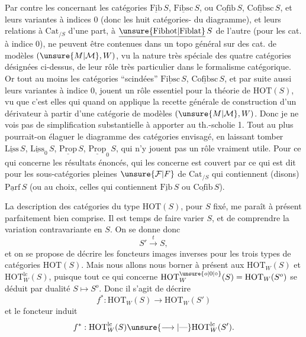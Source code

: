 Par contre les  concernant les catégories $\underline{\mathrm{Fib}}\,S$, $\underline{\mathrm{Fibsc}}\,S$, ou $\underline{\mathrm{Cofib}}\,S$, $\underline{\mathrm{Cofibsc}}\,S$, et leurs variantes à indices $0$ (donc les huit catégories- du diagramme), et leurs relations à $\mathrm{Cat}_{/S}$ d'une part, à $\underline{\unsure{\mathrm{Fibhot}|\mathrm{Fiblat}}}\,S$ de l'autre (pour les cat. à indice $0$), ne peuvent être contenues dans un topo général sur des  cat. de modèles $(\unsure{M|\mathcal M},W)$,  vu la nature très spéciale des quatre catégories désignées ci-dessus, de leur rôle très particulier dans le  formalisme catégorique. Or tout au moins les catégories ``scindées'' $\underline{\mathrm{Fibsc}}\,S$, $\underline{\mathrm{Cofibsc}}\,S$, et par suite aussi leurs variantes à indice $0$, jouent un rôle essentiel pour la théorie de $\mathrm{HOT}(S)$, vu que c'est elles qui
 quand on applique la recette générale de construction d'un dérivateur à partir d'une catégorie de modèles $(\unsure{M|\mathcal M},W)$. Donc je ne vois pas de simplification substantielle à apporter au th.-scholie 1. Tout au plus pourrait-on élaguer le diagramme des catégories envisagé, en laissant tomber $\underline{\mathrm{Liss}}\,S$, $\underline{\mathrm{Liss}}_0\,S$, $\underline{\mathrm{Prop}}\,S$, $\underline{\mathrm{Prop}}_0\,S$, qui n'y jouent pas un rôle vraiment utile.
Pour ce qui concerne les résultats énoncés,  qui les concerne est couvert par ce qui est dit pour les sous-catégories pleines $\unsure{\mathcal F|F}$ de $\mathrm{Cat}_{/S}$ qui contiennent (disons) $\underline{\mathrm{Parf}}\,S$ (ou au choix, celles qui contiennent $\underline{\mathrm{Fib}}\,S$ ou $\underline{\mathrm{Cofib}}\,S$).


La description des catégories du type $\mathrm{HOT}(S)$, pour $S$ fixé, me paraît à présent parfaitement bien comprise. Il est temps de faire varier $S$, et de comprendre la variation contravariante en $S$. On se donne donc
\[
S'\xrightarrow{t}S,
\]
et on se propose de décrire les foncteurs images inverses pour les trois types de catégories $\mathrm{HOT}(S)$. Mais nous allons nous borner à présent aux $\mathrm{HOT}_W(S)$ et $\mathrm{HOT}^{\mathrm{lc}}_W(S)$, puisque tout ce qui concerne $\mathrm{HOT}^{\unsure{o|0|\circ}}_W(S)=\mathrm{HOT}_W(S^o)$  se déduit par dualité $S\longmapsto S^o$. Donc il s'agit de décrire
\[
f^*:\mathrm{HOT}_W(S)\longrightarrow\mathrm{HOT}_W(S')\tag*{$(*)$}
\]
et le foncteur induit
\[
f^*:\mathrm{HOT}^{\mathrm{lc}}_W(S)\unsure{\longrightarrow|\text{---}}\mathrm{HOT}^{\mathrm{lc}}_W(S').
\]

